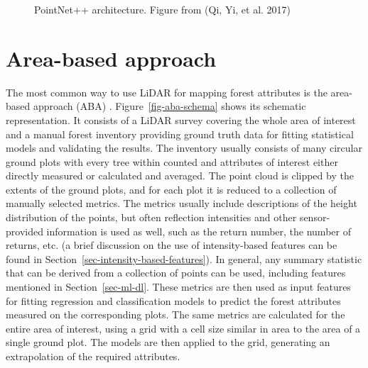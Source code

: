 \begin{figure}
\caption[PointNet++ architecture]{\label{fig-pointnet2-architecture}PointNet++ architecture.
Figure from (Qi, Yi, et al. 2017)}
\end{figure}

\section{Area-based approach}\label{sec-area-based-approach}

The most common way to use LiDAR for mapping forest attributes is the area-based approach (ABA) \citep{whiteABAGuide2013}.
Figure~\ref{fig-aba-schema} shows its schematic representation.
It consists of a LiDAR survey covering the whole area of interest and a manual forest inventory providing ground truth data for fitting statistical models and validating the results.
The inventory usually consists of many circular ground plots with every tree within counted and attributes of interest either directly measured or calculated and averaged.
The point cloud is clipped by the extents of the ground plots, and for each plot it is reduced to a collection of manually selected metrics.
The metrics usually include descriptions of the height distribution of the points, but often reflection intensities and other sensor-provided information is used as well, such as the return number, the number of returns, etc. (a brief discussion on the use of intensity-based features can be found in Section~\ref{sec-intensity-based-features}).
In general, any summary statistic that can be derived from a collection of points can be used, including features mentioned in Section~\ref{sec-ml-dl}.
These metrics are then used as input features for fitting regression and classification models to predict the forest attributes measured on the corresponding plots.
The same metrics are calculated for the entire area of interest, using a grid with a cell size similar in area to the area of a single ground plot.
The models are then applied to the grid, generating an extrapolation of the required attributes.

